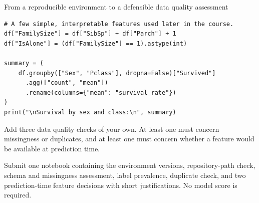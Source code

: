\begin{labproject}{From a reproducible environment to a defensible data quality assessment}
\begin{lstlisting}[style=mlpython]
# A few simple, interpretable features used later in the course.
df["FamilySize"] = df["SibSp"] + df["Parch"] + 1
df["IsAlone"] = (df["FamilySize"] == 1).astype(int)

summary = (
    df.groupby(["Sex", "Pclass"], dropna=False)["Survived"]
      .agg(["count", "mean"])
      .rename(columns={"mean": "survival_rate"})
)
print("\nSurvival by sex and class:\n", summary)
\end{lstlisting}

\begin{tryit}
Add three data quality checks of your own. At least one must concern missingness or duplicates, and at least one must concern whether a feature would be available at prediction time.
\end{tryit}
\end{labproject}

\begin{labdeliverable}
Submit one notebook containing the environment versions, repository-path check, schema and missingness assessment, label prevalence, duplicate check, and two prediction-time feature decisions with short justifications. No model score is required.
\end{labdeliverable}
